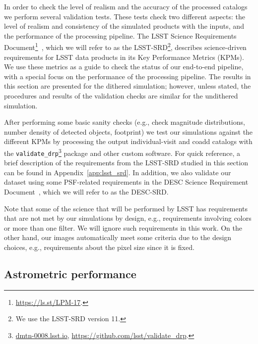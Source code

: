 \documentclass[a4paper,fleqn,usenatbib]{mnras}
\begin{document}

In order to check the level of realism and the accuracy of the processed catalogs we perform several validation tests. These tests check two different aspects: the level of realism and consistency of the simulated products with the inputs, and the performance of the processing pipeline. The LSST Science Requirements Document\footnote{\url{https://ls.st/LPM-17}.}~\citep{LPM-17}, which we will refer to as the LSST-SRD\footnote{We use the LSST-SRD version 11.}, describes science-driven requirements for LSST data products in its Key Performance Metrics (KPMs). We use these metrics as a guide to check the status of our end-to-end pipeline, with a special focus on the performance of the processing pipeline. The results in this section are presented for the dithered simulation; however, unless stated, the procedures and results of the validation checks are similar for the undithered simulation. 

After performing some basic sanity checks (e.g., check magnitude distributions, number density of detected objects, footprint) we test our simulations against the different KPMs by processing the output individual-visit and coadd catalogs with the \texttt{validate\_drp}\footnote{\url{dmtn-0008.lsst.io}, \url{https://github.com/lsst/validate_drp}.} package and other custom software. For quick reference, a brief description of the requirements from the LSST-SRD studied in this section can be found in Appendix~\ref{app:lsst_srd}. In addition, we also validate our dataset using some PSF-related requirements in the DESC Science Requirement Document~\citep{2018arXiv180901669T}, which we will refer to as the DESC-SRD.
 
Note that some of the science that will be performed by LSST has requirements that are not met by our simulations by design, e.g., requirements involving colors or more than one filter. We will ignore such requirements in this work. On the other hand, our images automatically meet some criteria due to the design choices, e.g., requirements about the pixel size since it is fixed. 

\subsection{Astrometric performance}
\label{sssec:astrometry}
\end{document}
